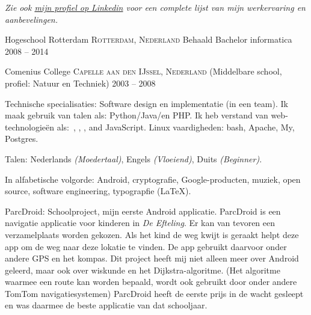 \documentclass[10pt,a4paper]{article}
\begin{document}
\begin{center}
  \emph{Zie ook \href{http://www.linkedin.com/in/frankkie12345}{mijn profiel op Linkedin} voor een complete lijst van mijn werkervaring en aanbevelingen.}
\end{center}


\spacedhrule{-0.2em}{-0.4em}


\headedsection
  {Hogeschool Rotterdam}
  {\textsc{Rotterdam, Nederland}} {%
  \headedsubsection
    {Behaald Bachelor informatica}
    {2008 -- 2014}
    {}
}

\headedsection
  {Comenius College}
  {\textsc{Capelle aan den IJssel, Nederland}} {%
  \headedsubsection
    { \textnormal{(Middelbare school, profiel: Natuur en Techniek)}}
    {2003 -- 2008} {}
}


\spacedhrule{0.5em}{-0.4em}


\inlineheadsection  %
  {Technische specialisaties:}
  {Software design en implementatie (in een team). 
  Ik maak gebruik van talen als: Python/\nsp Java/\nsp en PHP. 
  Ik heb verstand van web-technologie\"en als:\ , , ,  and JavaScript. Linux vaardigheden: bash, Apache, My, Postgres.}

\inlineheadsection
  {Talen:}
  {Nederlands \emph{(Moedertaal)}, Engels \emph{(Vloeiend)}, Duits \emph{(Beginner)}.}


\spacedhrule{1.6em}{-0.4em}


\inlineheadsection
  {In alfabetische volgorde:}
  {Android, cryptografie, Google-producten, muziek, open source,  software engineering, typograpfie (\LaTeX).}

\spacedhrule{1.6em}{-0.4em}


\inlineheadsection
  {ParcDroid:}
  {Schoolproject, mijn eerste Android applicatie. ParcDroid is een navigatie applicatie voor kinderen in \emph{De Efteling}. Er kan van tevoren een verzamelplaats worden gekozen. Als het kind de weg kwijt is geraakt helpt deze app om de weg naar deze lokatie te vinden. De app gebruikt daarvoor onder andere GPS en het kompas. Dit project heeft mij niet alleen meer over Android geleerd, maar ook over wiskunde en het Dijkstra-algoritme. (Het algoritme waarmee een route kan worden bepaald, wordt ook gebruikt door onder andere TomTom navigatiesystemen) ParcDroid heeft de eerste prijs in de wacht gesleept en was daarmee de beste applicatie van dat schooljaar.}
  
\end{document}

